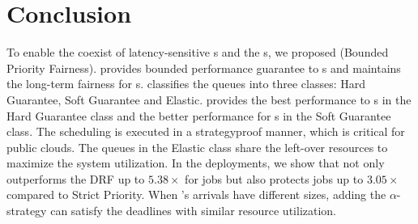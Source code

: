\section{Conclusion}
\label{sec:outro}

To enable the coexist of latency-sensitive {\burstq}s and the {\batchq}s, we proposed \name (Bounded Priority Fairness).
\name provides bounded performance guarantee to {\burstq}s and maintains the long-term fairness for {\batchq}s.
\name classifies the queues into three classes: Hard Guarantee, Soft Guarantee and Elastic.
\name provides the best performance to {\burstq}s in the Hard Guarantee class and the better performance for {\burstq}s in the Soft Guarantee class. The scheduling is executed in a strategyproof manner, which is critical for public clouds. 
The queues in the Elastic class share the left-over resources to maximize the system utilization. 
In the deployments, we show that \name not only outperforms the DRF up to $5.38\times$ for {\burstq} jobs but also protects {\batchq} jobs up to $3.05\times$ compared to Strict Priority. When {\burstq}'s arrivals have different sizes, adding the $\alpha$-strategy can satisfy the deadlines with similar resource utilization.


\label{EndOfPaper}





